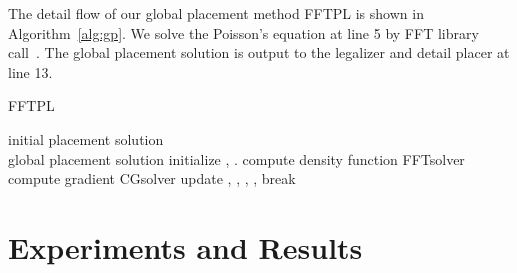 \documentclass[conference,10pt]{IEEEtran}
\begin{document}
The detail flow of our global placement method FFTPL 
is shown in Algorithm~\ref{alg:gp}. 
We solve the Poisson's equation 
at line 5 by FFT library call~\cite{fft}. 
The global placement solution  is output to the legalizer 
and detail placer at line 13. 
\begin{algorithm}
\caption{FFTPL}
\label{alg:gp}
\begin{algorithmic}[1]
\REQUIRE 
initial placement solution  \\
\ENSURE
global placement solution 
\STATE initialize , . \FOR {}
\STATE 
\STATE compute density function 
\STATE FFTsolver
\STATE compute gradient 
\STATE CGsolver
\STATE update , , ,  \IF {} \STATE , break 
\ENDIF
\ENDFOR
{} 
\end{algorithmic}
\end{algorithm}










\section{Experiments and Results}
\label{sec:exp}
\end{document}
